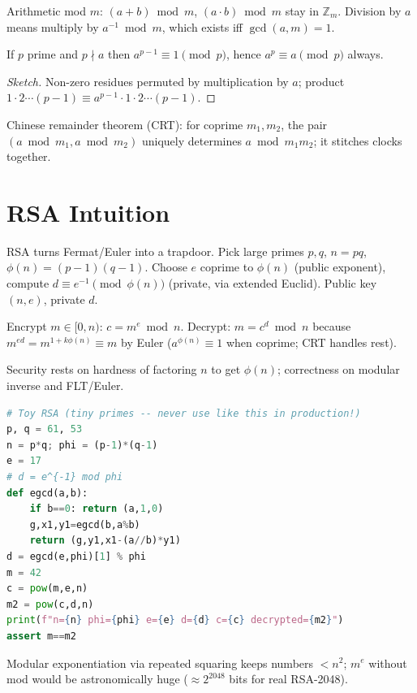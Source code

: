 Arithmetic mod $m$: $(a+b)\bmod m$, $(a\cdot b)\bmod m$ stay in $\mathbb{Z}_m$. Division by $a$ means multiply by $a^{-1}\bmod m$, which exists iff $\gcd(a,m)=1$.

\begin{theorem}
If $p$ prime and $p\nmid a$ then $a^{p-1}\equiv1\pmod p$, hence $a^p\equiv a\pmod p$ always.
\end{theorem}
\begin{proof}[Sketch] Non-zero residues permuted by multiplication by $a$; product $1\cdot2\cdots(p-1)\equiv a^{p-1}\cdot1\cdot2\cdots(p-1)$.
\end{proof}

Chinese remainder theorem (CRT): for coprime $m_1,m_2$, the pair $(a\bmod m_1,a\bmod m_2)$ uniquely determines $a\bmod m_1m_2$; it stitches clocks together.

\section{RSA Intuition}
\label{sec:rsa}
RSA turns Fermat/Euler into a trapdoor. Pick large primes $p,q$, $n=pq$, $\phi(n)=(p-1)(q-1)$. Choose $e$ coprime to $\phi(n)$ (public exponent), compute $d\equiv e^{-1}\pmod{\phi(n)}$ (private, via extended Euclid). Public key $(n,e)$, private $d$.

Encrypt $m\in[0,n)$: $c=m^e\bmod n$. Decrypt: $m=c^d\bmod n$ because $m^{ed}=m^{1+k\phi(n)}\equiv m$ by Euler ($a^{\phi(n)}\equiv1$ when coprime; CRT handles rest).

Security rests on hardness of factoring $n$ to get $\phi(n)$; correctness on modular inverse and FLT/Euler.

\begin{lstlisting}[language=Python]
# Toy RSA (tiny primes -- never use like this in production!)
p, q = 61, 53
n = p*q; phi = (p-1)*(q-1)
e = 17
# d = e^{-1} mod phi
def egcd(a,b):
    if b==0: return (a,1,0)
    g,x1,y1=egcd(b,a%b)
    return (g,y1,x1-(a//b)*y1)
d = egcd(e,phi)[1] % phi
m = 42
c = pow(m,e,n)
m2 = pow(c,d,n)
print(f"n={n} phi={phi} e={e} d={d} c={c} decrypted={m2}")
assert m==m2
\end{lstlisting}

\begin{remark}
Modular exponentiation via repeated squaring keeps numbers $<n^2$; $m^e$ without mod would be astronomically huge ($\approx2^{2048}$ bits for real RSA-2048).
\end{remark}


